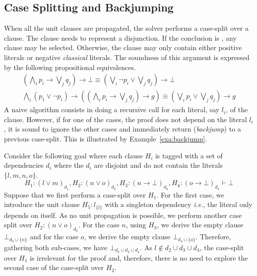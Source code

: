 \documentclass[utf8,a4paper,UKenglish,cleveref, autoref, thm-restate]{lipics-v2019}
\begin{document}
\subsection{Case Splitting and Backjumping}
\label{sec:case-split}

When all the unit clauses are propagated, the solver performs a
case-split over a clause. The clause needs to represent a
disjunction. If the conclusion is , any clause may be
selected. Otherwise, the clause may only contain  either positive literals or  negative
\emph{classical} literals. The soundness of this argument is expressed by
the following propositional equivalences.
\[
  \begin{array}{l}
  (\bigwedge_i p_i \to \bigvee_j q_j) \to \bot \equiv (\bigvee_i \neg p_i \lor \bigvee_j q_j) \to \bot\\
    \bigwedge_i (p_1 \lor \neg p_i) \to ((\bigwedge_i p_i \to \bigvee_j q_j) \to g) \equiv (\bigvee_i p_i \lor \bigvee_j q_j) \to g
  \end{array}
\]
A naive algorithm consists in doing a recursive call for each literal,
say $l_i$, of the clause.  However, if for one of the cases, the proof
does not depend on the literal $l_i$, it is sound to ignore the other
cases and immediately return (\emph{backjump}) to a previous
case-split. This is illustrated by Example~\ref{exa:backjump}.
\begin{example}[Backjumping]
  \label{exa:backjump}
  Consider the following goal where each clause $H_i$ is tagged with a
  set of dependencies $d_i$ where the $d_i$ are disjoint and do not
  contain the literals $\{l,m,n,o\}$.
  \[
    H_1 : (l \lor m)_{d_1}, 
    H_2 : (n \lor o)_{d_2},
    H_3 : (n \to \bot)_{d_3},
    H_4 : (o \to \bot)_{d_4}
    \vdash \bot
\]
Suppose that we first perform a case-split over $H_1$.  For the first
case, we introduce the unit clause $H_5:l_{\{l\}}$ with a singleton
dependency \emph{i.e.}, the literal only depends on itself. As no unit
propagation is possible, we perform another case split over $H_2: (n \lor o)_{d_2}$.
For the case $n$, using $H_3$, we derive the empty clause
$\bot_{d_3 \cup \{n\}}$ and for the case $o$, we derive the empty
clause $\bot_{d_4 \cup \{o\}}$. Therefore, gathering both sub-cases,
we have $\bot_{d_2 \cup d_3 \cup d_4}$.  As
$l \notin d_2 \cup d_3 \cup d_4$, the case-split over $H_1$ is
irrelevant for the proof and, therefore, there is no need to explore
the second case of the case-split over $H_2$.
\end{example}
\end{document}
